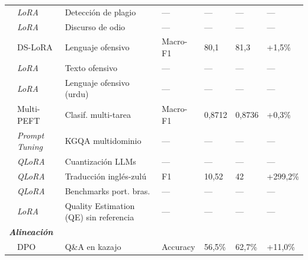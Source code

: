 \begin{longtable}{p{3.5cm} p{1.7cm} p{3.0cm} p{1.8cm} p{1.3cm} p{1.3cm} p{0.9cm}}
\scriptsize\autocite{meng2025triplanet} & \scriptsize\textit{LoRA} & \scriptsize Detección de plagio & \scriptsize --- & \scriptsize --- & \scriptsize --- & \scriptsize --- \\
\scriptsize\autocite{rathore2025ft} & \scriptsize\textit{LoRA} & \scriptsize Discurso de odio & \scriptsize --- & \scriptsize --- & \scriptsize --- & \scriptsize --- \\
\scriptsize\autocite{wang2025lora} & \scriptsize DS-LoRA & \scriptsize Lenguaje ofensivo & \scriptsize Macro-F1 & \scriptsize 80,1 & \scriptsize 81,3 & \scriptsize +1,5\% \\
\scriptsize\autocite{ye2025loraadv} & \scriptsize\textit{LoRA} & \scriptsize Texto ofensivo & \scriptsize --- & \scriptsize --- & \scriptsize --- & \scriptsize --- \\
\scriptsize\autocite{zain2025ruold} & \scriptsize\textit{LoRA} & \scriptsize Lenguaje ofensivo (urdu) & \scriptsize --- & \scriptsize --- & \scriptsize --- & \scriptsize --- \\
\scriptsize\autocite{jia2025agnostic} & \scriptsize Multi-PEFT & \scriptsize Clasif. multi-tarea & \scriptsize Macro-F1 & \scriptsize 0,8712 & \scriptsize 0,8736 & \scriptsize +0,3\% \\
\scriptsize\autocite{cheng2025prompt} & \scriptsize\textit{Prompt Tuning} & \scriptsize KGQA multidominio & \scriptsize --- & \scriptsize --- & \scriptsize --- & \scriptsize --- \\
\scriptsize\autocite{huang2024quant} & \scriptsize\textit{QLoRA} & \scriptsize Cuantización LLMs & \scriptsize --- & \scriptsize --- & \scriptsize --- & \scriptsize --- \\
\scriptsize\autocite{khoboko2025ft} & \scriptsize\textit{QLoRA} & \scriptsize Traducción inglés-zulú & \scriptsize F1 & \scriptsize 10,52 & \scriptsize 42 & \scriptsize +299,2\% \\
\scriptsize\autocite{paiola2025bode} & \scriptsize\textit{QLoRA} & \scriptsize Benchmarks port. bras. & \scriptsize --- & \scriptsize --- & \scriptsize --- & \scriptsize --- \\
\scriptsize\autocite{sindhujan2025translation} & \scriptsize\textit{LoRA} & \scriptsize Quality Estimation (QE) sin referencia & \scriptsize --- & \scriptsize --- & \scriptsize --- & \scriptsize --- \\
\multicolumn{7}{l}{\scriptsize\textbf{\textit{Alineación}}} \\[2pt]
\scriptsize\autocite{kadyrbek2025dpo} & \scriptsize DPO & \scriptsize Q\&A en kazajo & \scriptsize Accuracy & \scriptsize 56,5\% & \scriptsize 62,7\% & \scriptsize +11,0\% \\

\end{longtable}
